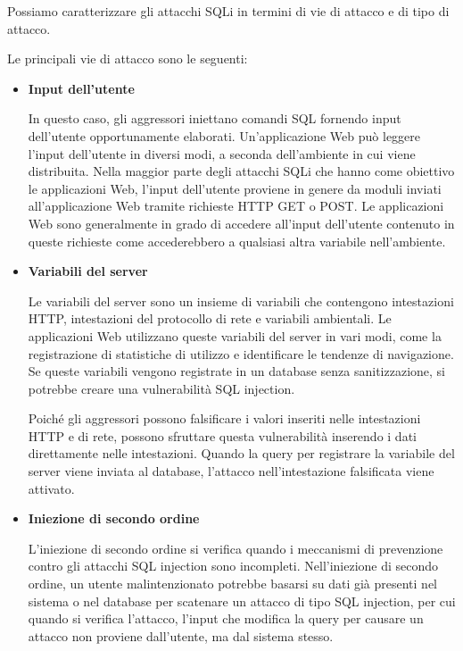 Possiamo caratterizzare gli attacchi SQLi in termini di vie di attacco e di tipo di attacco.

\singlespacing

Le principali vie di attacco sono le seguenti:

\begin{itemize}
    \item \textbf{Input dell'utente}
    
    In questo caso, gli aggressori iniettano comandi SQL fornendo input dell'utente opportunamente elaborati. Un'applicazione Web può leggere l'input dell'utente in diversi modi, a seconda dell'ambiente in cui viene distribuita. Nella maggior parte degli attacchi SQLi che hanno come obiettivo le applicazioni Web, l'input dell'utente proviene in genere da moduli inviati all'applicazione Web tramite richieste HTTP GET o POST. Le applicazioni Web sono generalmente in grado di accedere all'input dell'utente contenuto in queste richieste come accederebbero a qualsiasi altra variabile nell'ambiente. 
    
    \item \textbf{Variabili del server} 
    
    Le variabili del server sono un insieme di variabili che contengono intestazioni HTTP, intestazioni del protocollo di rete e variabili ambientali. Le applicazioni Web utilizzano queste variabili del server in vari modi, come la registrazione di statistiche di utilizzo e identificare le tendenze di navigazione. Se queste variabili vengono registrate in un database senza sanitizzazione, si potrebbe creare una vulnerabilità SQL injection.
    
    Poiché gli aggressori possono falsificare i valori inseriti nelle intestazioni HTTP e di rete, possono sfruttare questa vulnerabilità inserendo i dati direttamente nelle intestazioni. Quando la query per registrare la variabile del server viene inviata al database, l'attacco nell'intestazione falsificata viene attivato.
    
    \item \textbf{Iniezione di secondo ordine}
    
    L'iniezione di secondo ordine si verifica quando i meccanismi di prevenzione contro gli attacchi SQL injection sono incompleti. Nell'iniezione di secondo ordine, un utente malintenzionato potrebbe basarsi su dati già presenti nel sistema o nel database per scatenare un attacco di tipo SQL injection, per cui quando si verifica l'attacco, l'input che modifica la query per causare un attacco non proviene dall'utente, ma dal sistema stesso.
    

\end{itemize}
